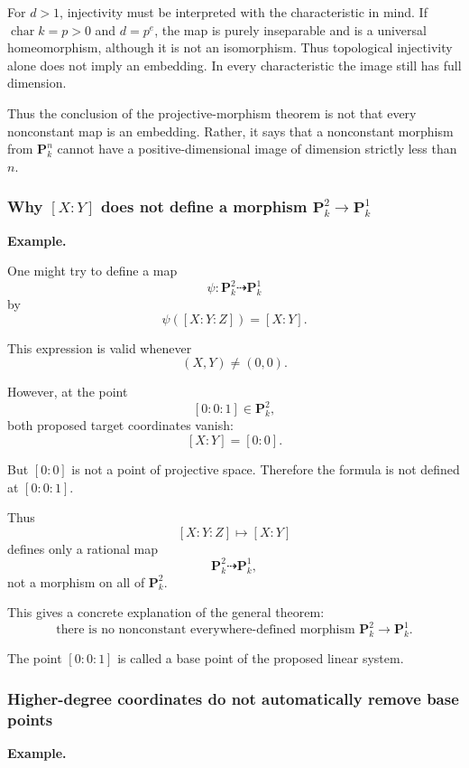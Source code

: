 For \(d>1\), injectivity must be interpreted with the characteristic
in mind. If \(\operatorname{char}k=p>0\) and \(d=p^e\), the map is
purely inseparable and is a universal homeomorphism, although it is
not an isomorphism. Thus topological injectivity alone does not imply
an embedding. In every characteristic the image still has full
dimension.

Thus the conclusion of the projective-morphism theorem is not that every nonconstant map is an embedding. Rather, it says that a nonconstant morphism from \(\mathbf P^n_k\) cannot have a positive-dimensional image of dimension strictly less than \(n\).

\subsubsection{\texorpdfstring{Why \([X:Y]\) does not define a morphism \(\mathbf P^2_k\to\mathbf P^1_k\)}{An invalid projection}}

\textbf{Example.}

One might try to define a map
\[
\psi:\mathbf P^2_k\dashrightarrow\mathbf P^1_k
\]
by
\[
\psi([X:Y:Z])=[X:Y].
\]

This expression is valid whenever
\[
(X,Y)\neq(0,0).
\]

However, at the point
\[
[0:0:1]\in\mathbf P^2_k,
\]
both proposed target coordinates vanish:
\[
[X:Y]=[0:0].
\]

But \([0:0]\) is not a point of projective space. Therefore the formula is not defined at \([0:0:1]\).

Thus
\[
[X:Y:Z]\longmapsto[X:Y]
\]
defines only a rational map
\[
\mathbf P^2_k\dashrightarrow\mathbf P^1_k,
\]
not a morphism on all of \(\mathbf P^2_k\).

This gives a concrete explanation of the general theorem:
\[
\boxed{
	\text{there is no nonconstant everywhere-defined morphism }
	\mathbf P^2_k\longrightarrow\mathbf P^1_k.
}
\]

The point \([0:0:1]\) is called a base point of the proposed linear system.

\subsubsection{Higher-degree coordinates do not automatically remove base points}

\textbf{Example.}

